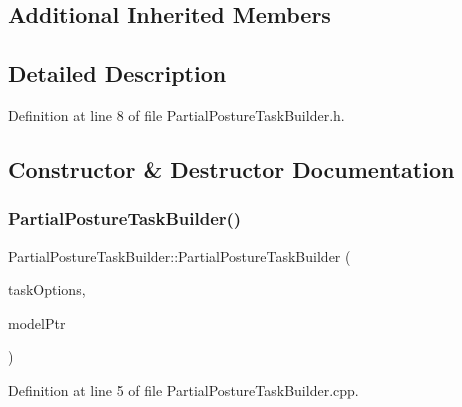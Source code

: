 \subsection*{Additional Inherited Members}


\subsection{Detailed Description}


Definition at line 8 of file Partial\+Posture\+Task\+Builder.\+h.



\subsection{Constructor \& Destructor Documentation}
\hypertarget{classocra_1_1PartialPostureTaskBuilder_a4c8585a8722241b52a02ccb73bb3a675}{}\label{classocra_1_1PartialPostureTaskBuilder_a4c8585a8722241b52a02ccb73bb3a675} 
\subsubsection{\texorpdfstring{Partial\+Posture\+Task\+Builder()}{PartialPostureTaskBuilder()}}
{\footnotesize\ttfamily Partial\+Posture\+Task\+Builder\+::\+Partial\+Posture\+Task\+Builder (\begin{DoxyParamCaption}\item[{const \hyperlink{classocra_1_1TaskBuilderOptions}{Task\+Builder\+Options} \&}]{task\+Options,  }\item[{Model\+::\+Ptr}]{model\+Ptr }\end{DoxyParamCaption})}



Definition at line 5 of file Partial\+Posture\+Task\+Builder.\+cpp.

\hypertarget{classocra_1_1PartialPostureTaskBuilder_a59c3cec0e4480654c360af17dc195b5a}{}\label{classocra_1_1PartialPostureTaskBuilder_a59c3cec0e4480654c360af17dc195b5a} 
